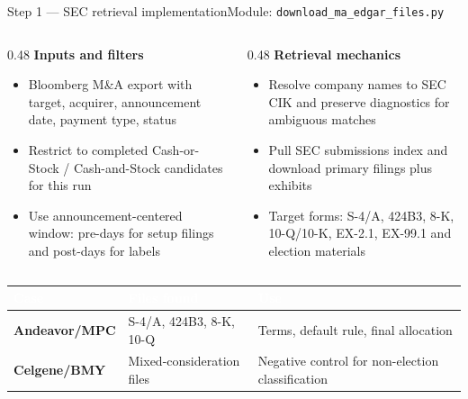 \documentclass[aspectratio=169,10pt]{beamer}
\newcommand{\hdr}[1]{\textcolor{white}{\normalfont\bfseries #1}}
\begin{document}
\begin{frame}{Step 1 --- SEC retrieval implementation}{Module: \texttt{download\_ma\_edgar\_files.py}}
  \begin{columns}[T]
    \begin{column}{0.48\textwidth}
      {\bfseries\color{navy}Inputs and filters}
      \begin{itemize}\small
        \item Bloomberg M\&A export with target, acquirer, announcement date, payment type, status
        \item Restrict to completed Cash-or-Stock / Cash-and-Stock candidates for this run
        \item Use announcement-centered window: pre-days for setup filings and post-days for labels
      \end{itemize}
    \end{column}
    \begin{column}{0.48\textwidth}
      {\bfseries\color{navy}Retrieval mechanics}
      \begin{itemize}\small
        \item Resolve company names to SEC CIK and preserve diagnostics for ambiguous matches
        \item Pull SEC submissions index and download primary filings plus exhibits
        \item Target forms: S-4/A, 424B3, 8-K, 10-Q/10-K, EX-2.1, EX-99.1 and election materials
      \end{itemize}
    \end{column}
  \end{columns}
  \vspace{0.3cm}
  \begin{tabularx}{\linewidth}{@{}>{\bfseries}p{2.8cm} p{4.6cm} X@{}}
    \rowcolor{navy}\hdr{Case} & \hdr{Files found} & \hdr{Use}\\ \midrule
    Andeavor/MPC & S-4/A, 424B3, 8-K, 10-Q & Terms, default rule, final allocation\\
    Celgene/BMY & Mixed-consideration files & Negative control for non-election classification\\
  \end{tabularx}
\end{frame}
\end{document}
